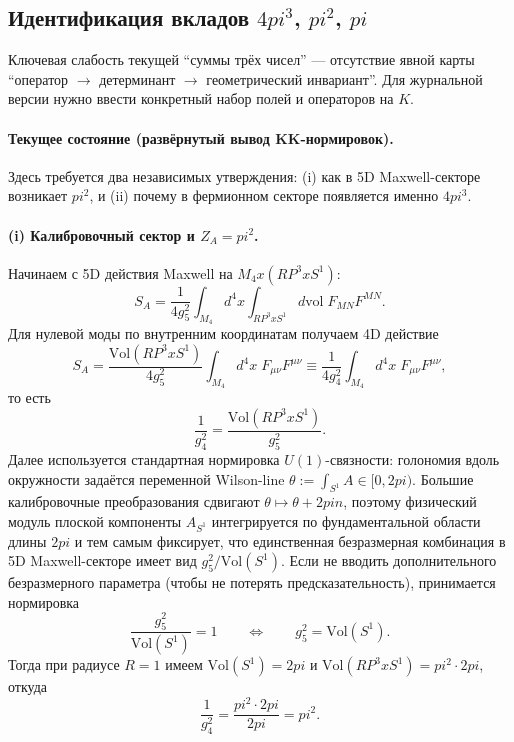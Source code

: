 \documentclass[12pt]{article}
\def\mathbb#1{#1}%
\def\pi{pi}%
\def\times{x}%
\begin{document}
\subsection{Идентификация вкладов $4\pi^3$, $\pi^2$, $\pi$}
Ключевая слабость текущей ``суммы трёх чисел'' --- отсутствие явной карты ``оператор $\to$ детерминант $\to$ геометрический инвариант''.
Для журнальной версии нужно ввести конкретный набор полей и операторов на $K$.

\paragraph{Текущее состояние (развёрнутый вывод KK-нормировок).}
Здесь требуется два независимых утверждения: (i) как в 5D Maxwell-секторе возникает $\pi^2$, и (ii) почему в фермионном секторе появляется именно $4\pi^3$.

\paragraph{(i) Калибровочный сектор и $Z_A=\pi^2$.}
Начинаем с 5D действия Maxwell на $M_4\times (\mathbb{RP}^3\times S^1)$:
\begin{equation}
S_A=\frac{1}{4g_5^2}\int_{M_4} d^4x\int_{\mathbb{RP}^3\times S^1} d\mathrm{vol}\; F_{MN}F^{MN}.
\end{equation}
Для нулевой моды по внутренним координатам получаем 4D действие
\begin{equation}
S_A=\frac{\mathrm{Vol}(\mathbb{RP}^3\times S^1)}{4g_5^2}\int_{M_4} d^4x\;F_{\mu\nu}F^{\mu\nu}
\equiv \frac{1}{4g_4^2}\int_{M_4} d^4x\;F_{\mu\nu}F^{\mu\nu},
\end{equation}
то есть
\begin{equation}
\frac{1}{g_4^2}=\frac{\mathrm{Vol}(\mathbb{RP}^3\times S^1)}{g_5^2}.
\end{equation}
Далее используется стандартная нормировка $U(1)$-связности: голономия вдоль окружности задаётся переменной Wilson-line
$\theta:=\int_{S^1}A\in[0,2\pi)$.
Большие калибровочные преобразования сдвигают $\theta\mapsto\theta+2\pi n$, поэтому физический модуль плоской компоненты $A_{S^1}$ интегрируется по фундаментальной области длины $2\pi$ и тем самым фиксирует, что единственная безразмерная комбинация в 5D Maxwell-секторе имеет вид $g_5^2/\mathrm{Vol}(S^1)$.
Если не вводить дополнительного безразмерного параметра (чтобы не потерять предсказательность), принимается нормировка
\begin{equation}
\frac{g_5^2}{\mathrm{Vol}(S^1)}=1
\qquad\Longleftrightarrow\qquad
g_5^2=\mathrm{Vol}(S^1).
\end{equation}
Тогда при радиусе $R=1$ имеем $\mathrm{Vol}(S^1)=2\pi$ и $\mathrm{Vol}(\mathbb{RP}^3\times S^1)=\pi^2\cdot 2\pi$, откуда
\begin{equation}
\frac{1}{g_4^2}=\frac{\pi^2\cdot 2\pi}{2\pi}=\pi^2.
\end{equation}
\end{document}
